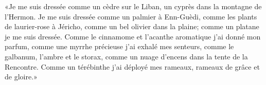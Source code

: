 «Je me suis dressée comme un cèdre sur le Liban,
	un cyprès dans la montagne de l’Hermon.
Je me suis dressée comme un palmier à Enn-Guèdi,
	comme les plants de laurier-rose à Jéricho,
	comme un bel olivier dans la plaine;
	comme un platane je me suis dressée.
Comme le cinnamome et l’acanthe aromatique j’ai donné mon parfum,
	comme une myrrhe précieuse j’ai exhalé mes senteurs,
	comme le galbanum, l’ambre et le storax,
	comme un nuage d’encens dans la tente de la Rencontre.
Comme un térébinthe j’ai déployé mes rameaux,
	rameaux de grâce et de gloire.»
